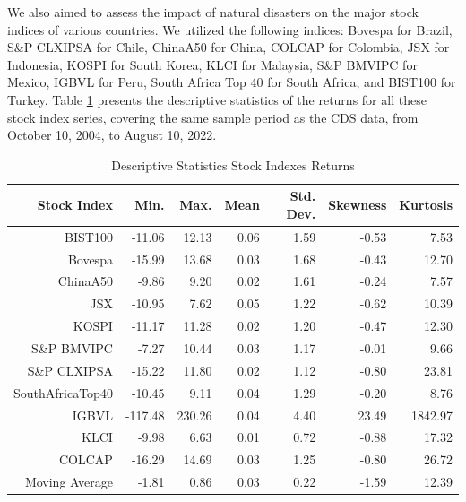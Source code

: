 \documentclass{article}
\begin{document}
We also aimed to assess the impact of natural disasters on the major stock indices of various countries. 
We utilized the following indices: Bovespa for Brazil, S\&P CLXIPSA for Chile, ChinaA50 for China, 
COLCAP for Colombia, JSX for Indonesia, KOSPI for South Korea, KLCI for Malaysia, S\&P BMVIPC for 
Mexico, IGBVL for Peru, South Africa Top 40 for South Africa, and BIST100 for Turkey. Table 
\ref{table:stock} presents the descriptive statistics of the returns for all these stock index 
series, covering the same sample period as the CDS data, from October 10, 2004, to August 10, 2022. \\

\begin{table}[H]
\centering
\small
\begin{tabular}{rrrrrrr}
  \hline
 Stock Index & Min. & Max. & Mean & Std. Dev. & Skewness & Kurtosis \\ 
  \hline
BIST100 & -11.06 & 12.13 & 0.06 & 1.59 & -0.53 & 7.53 \\ 
  Bovespa & -15.99 & 13.68 & 0.03 & 1.68 & -0.43 & 12.70 \\ 
  ChinaA50 & -9.86 & 9.20 & 0.02 & 1.61 & -0.24 & 7.57 \\ 
  JSX & -10.95 & 7.62 & 0.05 & 1.22 & -0.62 & 10.39 \\ 
  KOSPI & -11.17 & 11.28 & 0.02 & 1.20 & -0.47 & 12.30 \\ 
  S\&P BMVIPC & -7.27 & 10.44 & 0.03 & 1.17 & -0.01 & 9.66 \\ 
  S\&P CLXIPSA & -15.22 & 11.80 & 0.02 & 1.12 & -0.80 & 23.81 \\ 
  SouthAfricaTop40 & -10.45 & 9.11 & 0.04 & 1.29 & -0.20 & 8.76 \\ 
  IGBVL & -117.48 & 230.26 & 0.04 & 4.40 & 23.49 & 1842.97 \\ 
  KLCI & -9.98 & 6.63 & 0.01 & 0.72 & -0.88 & 17.32 \\ 
  COLCAP & -16.29 & 14.69 & 0.03 & 1.25 & -0.80 & 26.72 \\ 
  Moving Average & -1.81 & 0.86 & 0.03 & 0.22 & -1.59 & 12.39 \\ 
   \hline
\end{tabular}
\caption{Descriptive Statistics Stock Indexes Returns}
\label{table:stock}
\end{table}
\end{document}

